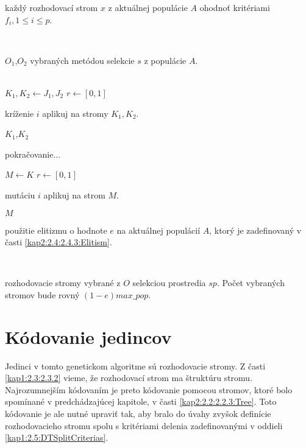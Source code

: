 \begin{algorithm}
\begin{algorithmic}[1]
\State \parbox[t]{350pt}{každý rozhodovací strom $x$ z aktuálnej populácie $A$ ohodnoť kritériami $f_i, 1 \leq i \leq p$.}
\EndProcedure
\\
\State \Return \parbox[t]{300pt}{$O_1$,$O_2$ vybraných metódou selekcie $s$ z populácie $A$.}
\EndFunction
\\
\State $K_1, K_2 \gets J_1, J_2$
\State $r \gets [0,1]$
	\State \parbox[t]{300pt}{kríženie $i$ aplikuj na stromy $K_1, K_2$.}
\EndIf
\State \Return $K_1$,$K_2$
\EndFor 
\EndFunction
{}
\end{algorithmic}
\end{algorithm}

\begin{algorithm}
\ContinuedFloat
\caption{pokračovanie...}
\begin{algorithmic}[1]
\State $M \gets K$
\State $r \gets [0,1]$
	\State \parbox[t]{300pt}{mutáciu $i$ aplikuj na strom $M$.}
\EndIf
\State \Return $M$
\EndFor 
\EndFunction
\\
\State \Return \parbox[t]{300pt}{použitie elitizmu o hodnote $e$ na aktuálnej populácií $A$, ktorý je zadefinovaný v časti \ref{kap2:2.4:2.4.3:Elitism}. }
\EndFunction
\\
\State \Return \parbox[t]{300pt}{rozhodovacie stromy vybrané z $O$ selekciou prostredia $sp$. Počet vybraných stromov bude rovný $(1-e)max\_pop$.}
\EndFunction
\end{algorithmic}
\end{algorithm}

\section{Kódovanie jedincov}\label{kap3:3.2:Encoding}
Jedinci v tomto genetickom algoritme sú rozhodovacie stromy. Z časti \ref{kap1:2.3:2.3.2} vieme, že rozhodovací strom ma štruktúru stromu. Najrozumnejším kódovaním je preto kódovanie pomocou stromov, ktoré bolo spomínané v predchádzajúcej kapitole, v časti \ref{kap2:2.2:2.2.3:Tree}. Toto kódovanie je ale nutné upraviť tak, aby bralo do úvahy zvyšok definície rozhodovacieho stromu spolu s kritériami delenia zadefinovanými v oddieli \ref{kap1:2.5:DTSplitCriterias}.

